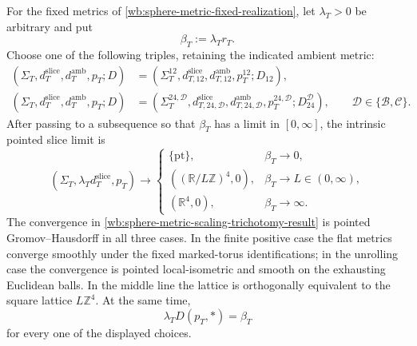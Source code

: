 \begin{theorem}
\label{wb:sphere-metric-scaling-trichotomy}

For the fixed metrics of
\cref{wb:sphere-metric-fixed-realization}, let \(\lambda_T>0\) be arbitrary
and put
\[
 \beta_T:=\lambda_Tr_T.
\]
Choose one of the following triples, retaining the indicated ambient
metric:
\[
 \begin{split}
  (\Sigma_T,d_T^{\mathrm{slice}},d_T^{\mathrm{amb}},p_T;D)
  &=(\Sigma_T^{12},d_{T,12}^{\mathrm{slice}},
      d_{T,12}^{\mathrm{amb}},p_T^{12};D_{12}),\\
  (\Sigma_T,d_T^{\mathrm{slice}},d_T^{\mathrm{amb}},p_T;D)
  &=(\Sigma_T^{24,\mathcal D},
      d_{T,24,\mathcal D}^{\mathrm{slice}},
      d_{T,24,\mathcal D}^{\mathrm{amb}},
      p_T^{24,\mathcal D};D_{24}^{\mathcal D}),
      \qquad \mathcal D\in\{\mathcal B,\mathcal C\}.
 \end{split}
\]
After passing to a subsequence so that \(\beta_T\) has a limit in
\([0,\infty]\), the intrinsic pointed slice limit is
\begin{equation}
 (\Sigma_T,\lambda_Td_T^{\mathrm{slice}},p_T)
 \longrightarrow
 \begin{cases}
  \{\mathrm{pt}\},&\beta_T\longrightarrow0,\\
  ((\mathbb R/L\mathbb Z)^4,0),
      &\beta_T\longrightarrow L\in(0,\infty),\\
  (\mathbb R^4,0),&\beta_T\longrightarrow\infty.
 \end{cases}
 \label{wb:sphere-metric-scaling-trichotomy-result}
\end{equation}
The convergence in
\eqref{wb:sphere-metric-scaling-trichotomy-result} is pointed
Gromov--Hausdorff in all three cases.  In the finite positive case the flat
metrics converge smoothly under the fixed marked-torus identifications; in
the unrolling case the convergence is pointed local-isometric and smooth on
the exhausting Euclidean balls.
In the middle line the lattice is orthogonally equivalent to the square
lattice \(L\mathbb Z^4\).  At the same time,
\begin{equation}
 \lambda_TD(p_T,*)=\beta_T
 \label{wb:sphere-metric-vertex-distance}
\end{equation}
for every one of the displayed choices.


\end{theorem}
